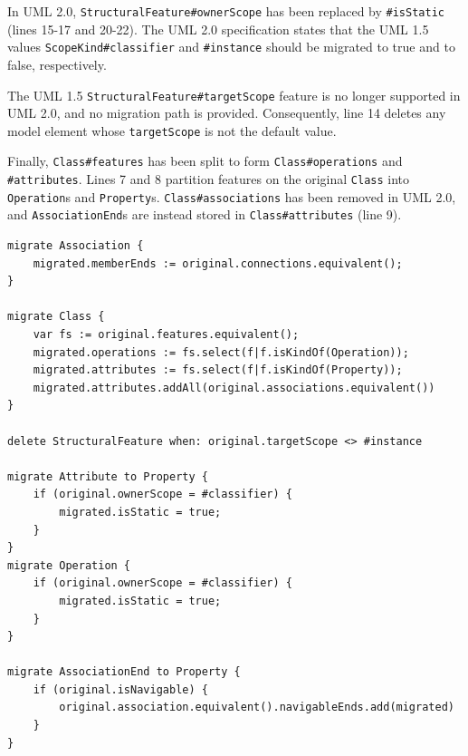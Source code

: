 In UML 2.0, \texttt{St\-ru\-ct\-ur\-alFe\-at\-ur\-e\#o\-wn\-er\-Sc\-op\-e} has been replaced by \texttt{\#i\-sS\-ta\-ti\-c} (lines 15-17 and 20-22). The UML 2.0 specification states that the UML 1.5 values \texttt{Sc\-op\-eKi\-nd\#cl\-as\-si\-fi\-er} and \texttt{\#i\-ns\-ta\-nce} should be migrated to true and to false, respectively. 

The UML 1.5 \texttt{St\-ru\-ct\-ur\-alFe\-at\-ur\-e\#t\-ar\-g\-et\-Sc\-op\-e} feature is no longer supported in UML 2.0, and no migration path is provided. Consequently, line 14 deletes any model element whose \texttt{t\-ar\-g\-et\-Sc\-op\-e} is not the default value.

Finally, \texttt{C\-la\-ss\#fe\-at\-ur\-es} has been split to form \texttt{C\-la\-ss\#op\-er\-at\-io\-ns} and \texttt{\#at\-tr\-ib\-ut\-es}. Lines 7 and 8 partition features on the original \texttt{Cl\-a\-ss} into \texttt{Op\-er\-at\-io\-n}s and \texttt{Pr\-op\-er\-ty}s. \texttt{Cl\-as\-s\#a\-ss\-oc\-ia\-ti\-on\-s} has been removed in UML 2.0, and \texttt{As\-so\-ci\-at\-i\-onEn\-d}s are instead stored in \texttt{Cl\-a\-ss\#at\-tr\-ib\-ut\-es} (line 9).

\begin{lstlisting}[caption=UML model migration in Flock, label=lst:flock-uml, language=Flock, float=tb]
migrate Association {
	migrated.memberEnds := original.connections.equivalent();
}

migrate Class {
	var fs := original.features.equivalent();
	migrated.operations := fs.select(f|f.isKindOf(Operation));
	migrated.attributes := fs.select(f|f.isKindOf(Property));
	migrated.attributes.addAll(original.associations.equivalent())
}

delete StructuralFeature when: original.targetScope <> #instance

migrate Attribute to Property {
	if (original.ownerScope = #classifier) {
		migrated.isStatic = true;		
	}
}
migrate Operation {
	if (original.ownerScope = #classifier) {
		migrated.isStatic = true;
	}
}

migrate AssociationEnd to Property {
	if (original.isNavigable) {
		original.association.equivalent().navigableEnds.add(migrated)
	}
}
\end{lstlisting}

